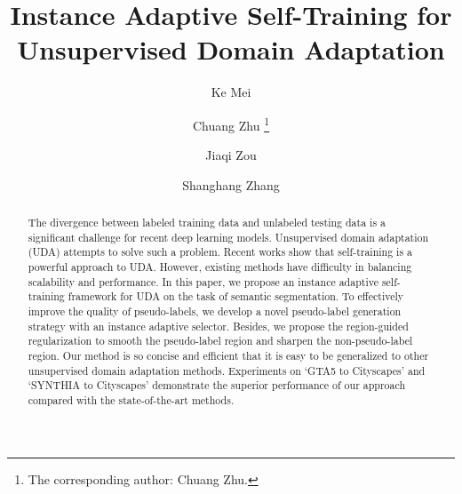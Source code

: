 \documentclass[runningheads]{llncs}
\begin{document}
\pagestyle{headings}
\mainmatter
\def\ECCVSubNumber{5406}  

\title{Instance Adaptive Self-Training for Unsupervised Domain Adaptation} 

\begin{comment}
\titlerunning{ECCV-20 submission ID \ECCVSubNumber} 
\authorrunning{ECCV-20 submission ID \ECCVSubNumber} 
\author{Anonymous ECCV submission}
\institute{Paper ID \ECCVSubNumber}
\end{comment}


\author{Ke Mei \and
Chuang Zhu \thanks{The corresponding author: Chuang Zhu.} \and
Jiaqi Zou \and Shanghang Zhang}

\maketitle

\begin{abstract}
The divergence between labeled training data and unlabeled testing data is a significant challenge for recent deep learning models. Unsupervised domain adaptation (UDA) attempts to solve such a problem. Recent works show that self-training is a powerful approach to UDA. However, existing methods have difficulty in balancing scalability and performance. In this paper, we propose an instance adaptive self-training framework for UDA on the task of semantic segmentation. To effectively improve the quality of pseudo-labels, we develop a novel pseudo-label generation strategy with an instance adaptive selector. Besides, we propose the region-guided regularization to smooth the pseudo-label region and sharpen the non-pseudo-label region. Our method is so concise and efficient that it is easy to be generalized to other unsupervised domain adaptation methods. Experiments on `GTA5 to Cityscapes' and `SYNTHIA to Cityscapes' demonstrate the superior performance of our approach compared with the state-of-the-art methods.
\end{abstract}
\end{document}
